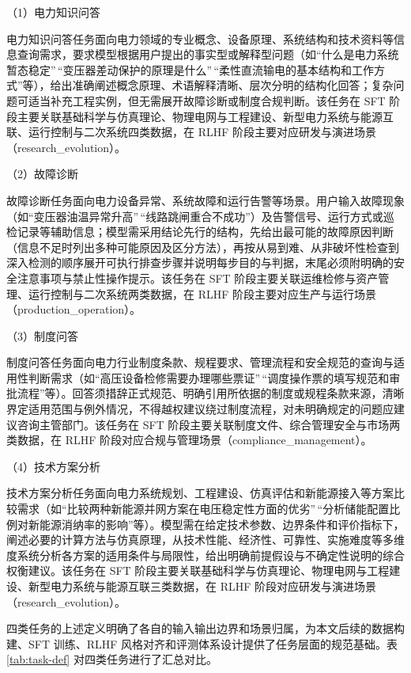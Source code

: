 \documentclass[fontset=fandol,type=master,campus=shenzhen,etitleauto=true]{hithesisbook}
\begin{document}
\noindent （1）电力知识问答

电力知识问答任务面向电力领域的专业概念、设备原理、系统结构和技术资料等信息查询需求，要求模型根据用户提出的事实型或解释型问题（如``什么是电力系统暂态稳定''\,``变压器差动保护的原理是什么''\,``柔性直流输电的基本结构和工作方式''等），给出准确阐述概念原理、术语解释清晰、层次分明的结构化回答；复杂问题可适当补充工程实例，但无需展开故障诊断或制度合规判断。该任务在 SFT 阶段主要关联基础科学与仿真理论、物理电网与工程建设、新型电力系统与能源互联、运行控制与二次系统四类数据，在 RLHF 阶段主要对应研发与演进场景（research\_evolution）。

\noindent （2）故障诊断

故障诊断任务面向电力设备异常、系统故障和运行告警等场景。用户输入故障现象（如``变压器油温异常升高''\,``线路跳闸重合不成功''）及告警信号、运行方式或巡检记录等辅助信息；模型需采用结论先行的结构，先给出最可能的故障原因判断（信息不足时列出多种可能原因及区分方法），再按从易到难、从非破坏性检查到深入检测的顺序展开可执行排查步骤并说明每步目的与判据，末尾必须附明确的安全注意事项与禁止性操作提示。该任务在 SFT 阶段主要关联运维检修与资产管理、运行控制与二次系统两类数据，在 RLHF 阶段主要对应生产与运行场景（production\_operation）。

\noindent （3）制度问答

制度问答任务面向电力行业制度条款、规程要求、管理流程和安全规范的查询与适用性判断需求（如``高压设备检修需要办理哪些票证''\,``调度操作票的填写规范和审批流程''等）。回答须措辞正式规范、明确引用所依据的制度或规程条款来源，清晰界定适用范围与例外情况，不得越权建议绕过制度流程，对未明确规定的问题应建议咨询主管部门。该任务在 SFT 阶段主要关联制度文件、综合管理安全与市场两类数据，在 RLHF 阶段对应合规与管理场景（compliance\_management）。

\noindent （4）技术方案分析

技术方案分析任务面向电力系统规划、工程建设、仿真评估和新能源接入等方案比较需求（如``比较两种新能源并网方案在电压稳定性方面的优劣''\,``分析储能配置比例对新能源消纳率的影响''等）。模型需在给定技术参数、边界条件和评价指标下，阐述必要的计算方法与仿真原理，从技术性能、经济性、可靠性、实施难度等多维度系统分析各方案的适用条件与局限性，给出明确前提假设与不确定性说明的综合权衡建议。该任务在 SFT 阶段主要关联基础科学与仿真理论、物理电网与工程建设、新型电力系统与能源互联三类数据，在 RLHF 阶段对应研发与演进场景（research\_evolution）。

四类任务的上述定义明确了各自的输入输出边界和场景归属，为本文后续的数据构建、SFT 训练、RLHF 风格对齐和评测体系设计提供了任务层面的规范基础。表 \ref{tab:task-def} 对四类任务进行了汇总对比。
\end{document}
